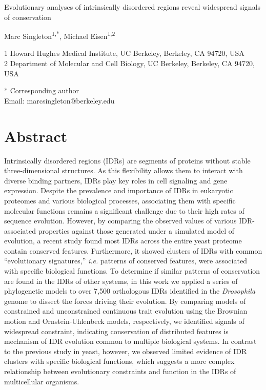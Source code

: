 Evolutionary analyses of intrinsically disordered regions reveal widespread signals of conservation

Marc Singleton\textsuperscript{1,*}, Michael Eisen\textsuperscript{1,2}

1 Howard Hughes Medical Institute, UC Berkeley, Berkeley, CA 94720, USA\\
2 Department of Molecular and Cell Biology, UC Berkeley, Berkeley, CA 94720, USA

* Corresponding author\\
Email: marcsingleton@berkeley.edu

\clearpage

\section{Abstract}
Intrinsically disordered regions (IDRs) are segments of proteins without stable three-dimensional structures. As this flexibility allows them to interact with diverse binding partners, IDRs play key roles in cell signaling and gene expression. Despite the prevalence and importance of IDRs in eukaryotic proteomes and various biological processes, associating them with specific molecular functions remains a significant challenge due to their high rates of sequence evolution. However, by comparing the observed values of various IDR-associated properties against those generated under a simulated model of evolution, a recent study found most IDRs across the entire yeast proteome contain conserved features. Furthermore, it showed clusters of IDRs with common ``evolutionary signatures,'' \textit{i.e.} patterns of conserved features, were associated with specific biological functions. To determine if similar patterns of conservation are found in the IDRs of other systems, in this work we applied a series of phylogenetic models to over 7,500 orthologous IDRs identified in the \textit{Drosophila} genome to dissect the forces driving their evolution. By comparing models of constrained and unconstrained continuous trait evolution using the Brownian motion and Ornstein-Uhlenbeck models, respectively, we identified signals of widespread constraint, indicating conservation of distributed features is mechanism of IDR evolution common to multiple biological systems. In contrast to the previous study in yeast, however, we observed limited evidence of IDR clusters with specific biological functions, which suggests a more complex relationship between evolutionary constraints and function in the IDRs of multicellular organisms.

